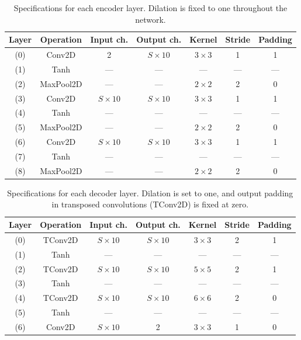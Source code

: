 \begin{table}[htbp]
\centering
\renewcommand{\arraystretch}{1.2}
\begin{tabular}{c|c|c|c|c|c|c}
\hline
\textbf{Layer} & \textbf{Operation} & \textbf{Input ch.} & \textbf{Output ch.} & \textbf{Kernel} & \textbf{Stride} & \textbf{Padding} \\
\hline \hline
(0) & Conv2D & 2 & $S \times 10$ & $3 \times 3$ & 1 & 1 \\
(1) & Tanh & --- & --- & --- & --- & --- \\
(2) & MaxPool2D & --- & --- & $2 \times 2$ & 2 & 0 \\
(3) & Conv2D & $S \times 10$ & $S \times 10$ & $3 \times 3$ & 1 & 1 \\
(4) & Tanh & --- & --- & --- & --- & --- \\
(5) & MaxPool2D & --- & --- & $2 \times 2$ & 2 & 0 \\
(6) & Conv2D & $S \times 10$ & $S \times 10$ & $3 \times 3$ & 1 & 1 \\
(7) & Tanh & --- & --- & --- & --- & --- \\
(8) & MaxPool2D & --- & --- & $2 \times 2$ & 2 & 0 \\
\hline
\end{tabular}
\caption[Specifications of the CDAE encoder layers]{Specifications for each encoder layer. Dilation is fixed to one throughout the network.}
\label{tab:qmp-encoder}
\end{table}

\begin{table}[htbp]
\centering
\renewcommand{\arraystretch}{1.2}
\begin{tabular}{c|c|c|c|c|c|c}
\hline
\textbf{Layer} & \textbf{Operation} & \textbf{Input ch.} & \textbf{Output ch.} & \textbf{Kernel} & \textbf{Stride} & \textbf{Padding} \\
\hline \hline
(0) & TConv2D & $S \times 10$ & $S \times 10$ & $3 \times 3$ & 2 & 1 \\
(1) & Tanh & --- & --- & --- & --- & --- \\
(2) & TConv2D & $S \times 10$ & $S \times 10$ & $5 \times 5$ & 2 & 1 \\
(3) & Tanh & --- & --- & --- & --- & --- \\
(4) & TConv2D & $S \times 10$ & $S \times 10$ & $6 \times 6$ & 2 & 0 \\
(5) & Tanh & --- & --- & --- & --- & --- \\
(6) & Conv2D & $S \times 10$ & 2 & $3 \times 3$ & 1 & 0 \\
\hline
\end{tabular}
\caption[Specifications of the CDAE decoder layers]{Specifications for each decoder layer. Dilation is set to one, and output padding in transposed convolutions (TConv2D) is fixed at zero.}
\label{tab:qmp-decoder}
\end{table}

